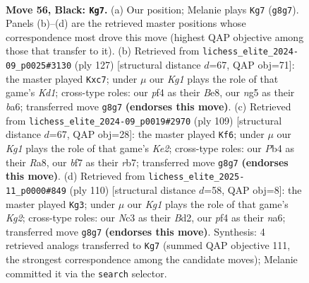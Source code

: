 \documentclass[11pt]{article}
\begin{document}
\clearpage

\begin{figure}[p]\centering
\begin{subfigure}{0.46\textwidth}\centering
\resizebox{\linewidth}{!}{%
\newchessgame
\chessboard[
  setfen={2b3k1/P2n1B2/4p3/5pN1/1pN2P2/1Pn3P1/5K1P/1R6 b - - 2 56},
  showmover=false,
  pgfstyle=straightmove, color=movearrow, markmove={g8-g7}
]}
\caption{}
\end{subfigure}\hfill
\begin{subfigure}{0.46\textwidth}\centering
\resizebox{\linewidth}{!}{%
\newchessgame
\chessboard[
  setfen={3kb3/2B3p1/B5Np/1p3p1n/1P3P2/P3K2P/8/8 b - - 0 64},
  showmover=false,
  pgfstyle=straightmove, color=movearrow, markmove={d8-c7}
]}
\caption{}
\end{subfigure}
\\[4pt]
\begin{subfigure}{0.46\textwidth}\centering
\resizebox{\linewidth}{!}{%
\newchessgame
\chessboard[
  setfen={r7/1R2k2p/3p2p1/3Pp3/n3P3/2N2P2/2K3P1/8 b - - 1 55},
  showmover=false,
  pgfstyle=straightmove, color=movearrow, markmove={e7-f6}
]}
\caption{}
\end{subfigure}\hfill
\begin{subfigure}{0.46\textwidth}\centering
\resizebox{\linewidth}{!}{%
\newchessgame
\chessboard[
  setfen={4kb2/N7/n4p1p/1NPpn1pP/1P4P1/8/3B2K1/8 w - - 1 56},
  showmover=false,
  pgfstyle=straightmove, color=movearrow, markmove={g2-g3}
]}
\caption{}
\end{subfigure}
\caption{\textbf{Move 56, Black: \texttt{Kg7}.} (a) Our position; Melanie plays \texttt{Kg7} (\texttt{g8g7}). Panels (b)--(d) are the retrieved master positions whose correspondence most drove this move (highest QAP objective among those that transfer to it). (b) Retrieved from \texttt{lichess\_elite\_2024-09\_p0025\#3130} (ply 127) [structural distance $d$=67, QAP obj=71]: the master played \texttt{Kxc7}; under $\mu$ our \emph{Kg1} plays the role of that game's \emph{Kd1}; cross-type roles: our \emph{p}f4 as their \emph{B}e8, our \emph{n}g5 as their \emph{b}a6; transferred move \texttt{g8g7} \textbf{(endorses this move)}. (c) Retrieved from \texttt{lichess\_elite\_2024-09\_p0019\#2970} (ply 109) [structural distance $d$=67, QAP obj=28]: the master played \texttt{Kf6}; under $\mu$ our \emph{Kg1} plays the role of that game's \emph{Ke2}; cross-type roles: our \emph{P}b4 as their \emph{R}a8, our \emph{b}f7 as their \emph{r}b7; transferred move \texttt{g8g7} \textbf{(endorses this move)}. (d) Retrieved from \texttt{lichess\_elite\_2025-11\_p0000\#849} (ply 110) [structural distance $d$=58, QAP obj=8]: the master played \texttt{Kg3}; under $\mu$ our \emph{Kg1} plays the role of that game's \emph{Kg2}; cross-type roles: our \emph{N}c3 as their \emph{B}d2, our \emph{p}f4 as their \emph{n}a6; transferred move \texttt{g8g7} \textbf{(endorses this move)}. Synthesis: 4 retrieved analogs transferred to \texttt{Kg7} (summed QAP objective 111, the strongest correspondence among the candidate moves); Melanie committed it via the \texttt{search} selector.}
\label{fig:thought-m111}
\end{figure}
\end{document}
